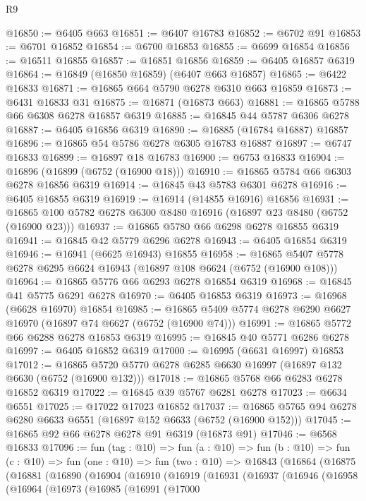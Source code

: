 \begin{lexlean}{R9}
\begin{coremodule}
@16850 := @6405 @663
@16851 := @6407 @16783
@16852 := @6702 @91
@16853 := @6701 @16852
@16854 := @6700 @16853
@16855 := @6699 @16854
@16856 := @16511 @16855
@16857 := @16851 @16856
@16859 := @6405 @16857 @6319
@16864 := @16849 (@16850 @16859) (@6407 @663 @16857)
@16865 := @6422 @16833
@16871 := @16865 @664 @5790 @6278 @6310 @663 @16859
@16873 := @6431 @16833 @31
@16875 := @16871 (@16873 @663)
@16881 := @16865 @5788 @66 @6308 @6278 @16857 @6319
@16885 := @16845 @44 @5787 @6306 @6278
@16887 := @6405 @16856 @6319
@16890 := @16885 (@16784 @16887) @16857
@16896 := @16865 @54 @5786 @6278 @6305 @16783 @16887
@16897 := @6747 @16833
@16899 := @16897 @18 @16783
@16900 := @6753 @16833
@16904 := @16896 (@16899 (@6752 (@16900 @18)))
@16910 := @16865 @5784 @66 @6303 @6278 @16856 @6319
@16914 := @16845 @43 @5783 @6301 @6278
@16916 := @6405 @16855 @6319
@16919 := @16914 (@14855 @16916) @16856
@16931 := @16865 @100 @5782 @6278 @6300 @8480 @16916 (@16897 @23 @8480 (@6752 (@16900 @23)))
@16937 := @16865 @5780 @66 @6298 @6278 @16855 @6319
@16941 := @16845 @42 @5779 @6296 @6278
@16943 := @6405 @16854 @6319
@16946 := @16941 (@6625 @16943) @16855
@16958 := @16865 @5407 @5778 @6278 @6295 @6624 @16943 (@16897 @108 @6624 (@6752 (@16900 @108)))
@16964 := @16865 @5776 @66 @6293 @6278 @16854 @6319
@16968 := @16845 @41 @5775 @6291 @6278
@16970 := @6405 @16853 @6319
@16973 := @16968 (@6628 @16970) @16854
@16985 := @16865 @5409 @5774 @6278 @6290 @6627 @16970 (@16897 @74 @6627 (@6752 (@16900 @74)))
@16991 := @16865 @5772 @66 @6288 @6278 @16853 @6319
@16995 := @16845 @40 @5771 @6286 @6278
@16997 := @6405 @16852 @6319
@17000 := @16995 (@6631 @16997) @16853
@17012 := @16865 @5720 @5770 @6278 @6285 @6630 @16997 (@16897 @132 @6630 (@6752 (@16900 @132)))
@17018 := @16865 @5768 @66 @6283 @6278 @16852 @6319
@17022 := @16845 @39 @5767 @6281 @6278
@17023 := @6634 @6551
@17025 := @17022 @17023 @16852
@17037 := @16865 @5765 @94 @6278 @6280 @6633 @6551 (@16897 @152 @6633 (@6752 (@16900 @152)))
@17045 := @16865 @92 @66 @6278 @6278 @91 @6319 (@16873 @91)
@17046 := @6568 @16833
@17096 := fun (tag : @10) =>
  fun (a : @10) =>
  fun (b : @10) =>
  fun (c : @10) =>
  fun (one : @10) =>
  fun (two : @10) =>
  @16843
    (@16864
      (@16875
        (@16881
          (@16890
            (@16904
              (@16910
                (@16919
                  (@16931
                    (@16937
                      (@16946
                        (@16958
                          (@16964
                            (@16973
                              (@16985
                                (@16991
                                  (@17000

\end{coremodule}
\end{lexlean}
